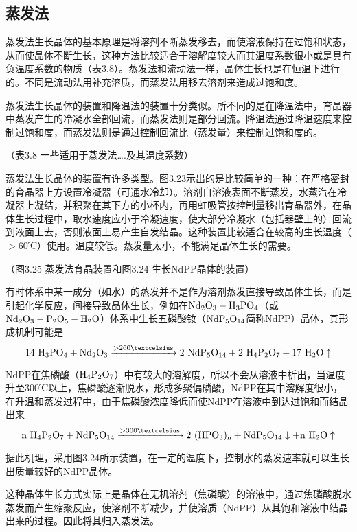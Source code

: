 ﻿\subsection{蒸发法}
蒸发法生长晶体的基本原理是将溶剂不断蒸发移去，而使溶液保持在过饱和状态，从而使晶体不断生长，这种方法比较适合于溶解度较大而其温度系数很小或是具有负温度系数的物质（表3.8）。蒸发法和流动法一样，晶体生长也是在恒温下进行的。不同是流动法用补充溶质，而蒸发法用移去溶剂来造成过饱和度。

蒸发法生长晶体的装置和降温法的装置十分类似。所不同的是在降温法中，育晶器中蒸发产生的冷凝水全部回流，而蒸发法则是部分回流。降温法通过降温速度来控制过饱和度，而蒸发法则是通过控制回流比（蒸发量）来控制过饱和度的。

（表3.8  一些适用于蒸发法….及其温度系数）

蒸发法生长晶体的装置有许多类型。图3.23示出的是比较简单的一种：在严格密封的育晶器上方设置冷凝器（可通水冷却）。溶剂自溶液表面不断蒸发，水蒸汽在冷凝器上凝结，并积聚在其下方的小杯内，再用虹吸管按控制量移出育晶器外，在晶体生长过程中，取水速度应小于冷凝速度，使大部分冷凝水（包括器壁上的）回流到液面上去，否则液面上易产生自发结晶。这种装置比较适合在较高的生长温度（$>$60℃）使用。温度较低。蒸发量太小，不能满足晶体生长的需要。

（图3.25 蒸发法育晶装置和图3.24 生长NdPP晶体的装置）

有时体系中某一成分（如水）的蒸发并不是作为溶剂蒸发直接导致晶体生长，而是引起化学反应，间接导致晶体生长，例如在$\rm Nd_2O_3-H_3PO_4$（或$\rm Nd_2O_3-P_2O_5-H_2O$）体系中生长五磷酸钕（$\rm NdP_5O_{14}$简称NdPP）晶体，其形成机制可能是
$$ \rm 14\ H_3PO_4 + Nd_2O_3 \xrightarrow{>260℃} 2\ NdP_5O_{14}+2\ H_4P_2O_7+17\ H_2O\uparrow$$

NdPP在焦磷酸（$\rm H_4P_2O_7$）中有较大的溶解度，所以不会从溶液中析出，当温度升至300℃以上，焦磷酸逐渐脱水，形成多聚偏磷酸，NdPP在其中溶解度很小，在升温和蒸发过程中，由于焦磷酸浓度降低而使NdPP在溶液中到达过饱和而结晶出来
$$\rm n\ H_4P_2O_7 + NdP_5O_{14} \xrightarrow{>300℃} 2\ (HPO_3)_n + NdP_5O_{14}\downarrow + n\ H_2O\uparrow $$

据此机理，采用图3.24所示装置，在一定的温度下，控制水的蒸发速率就可以生长出质量较好的NdPP晶体。

这种晶体生长方式实际上是晶体在无机溶剂（焦磷酸）的溶液中，通过焦磷酸脱水蒸发而产生缩聚反应，使溶剂不断减少，并使溶质（NdPP）从其饱和溶液中结晶出来的过程。因此将其归入蒸发法。